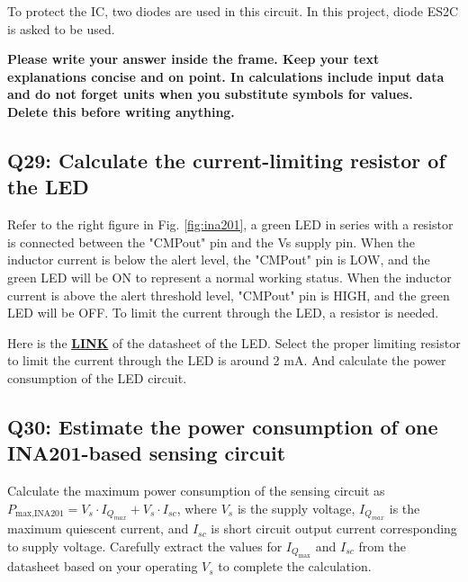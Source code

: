 \documentclass{PELsmallreport}
\begin{document}
To protect the IC, two diodes are used in this circuit. In this project, diode ES2C is asked to be used.

\begin{framed}
	\vspace{2em}
	\textbf{Please write your answer inside the frame. Keep your text explanations concise and on point. In calculations include input data and do not forget units when you substitute symbols for values. \\ Delete this before writing anything.}
	\vspace{2em}
\end{framed}

\quad {}\quad {}\hfill{}

\subsection{Q29: Calculate the current-limiting resistor of the LED}
Refer to the right figure in Fig. \ref{fig:ina201}, a green LED in series with a resistor is connected between the "CMPout" pin and the Vs supply pin. When the inductor current is below the alert level, the "CMPout" pin is LOW, and the green LED will be ON to represent a normal working status. When the inductor current is above the alert threshold level, "CMPout" pin is HIGH, and the green LED will be OFF. To limit the current through the LED, a resistor is needed.

Here is the \href{https://www.kingbrightusa.com/images/catalog/spec/wp710a10lgd.pdf}{\textbf{LINK}} of the datasheet of the LED. Select the proper limiting resistor to limit the current through the LED is around 2 mA. And calculate the power consumption of the LED circuit.\\ 
 \quad {}  \quad \hfill{}

\subsection{Q30: Estimate the power consumption of one INA201-based sensing circuit}
Calculate the maximum power consumption of the sensing circuit as $P_\text{max,INA201} = V_{s} \cdot I_{Q_{max}} + V_{s} \cdot I_{sc}$, where $V_s$ is the supply voltage, $I_{Q_{max}}$ is the maximum quiescent current, and $I_{sc}$ is short circuit output current corresponding to supply voltage. Carefully extract the values for $I_{Q_{\text{max}}}$ and $I_{sc}$ from the datasheet based on your operating $V_s$ to complete the calculation.\\
 \quad \hfill{}
\end{document}

